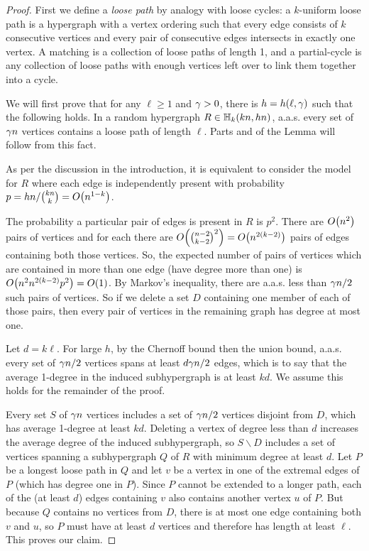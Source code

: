\documentclass[11pt,english]{article}
\theoremstyle{plain}
\theoremstyle{definition}
\theoremstyle{definition}
\theoremstyle{plain}
\theoremstyle{plain}
\theoremstyle{plain}
\theoremstyle{plain}
\theoremstyle{remark}
\theoremstyle{remark}
\let\originalleft\left
\let\originalright\right
\renewcommand{\left}{\mathopen{}\mathclose\bgroup\originalleft}
\renewcommand{\right}{\aftergroup\egroup\originalright}
\begin{document}
\begin{proof}
First we define a \emph{loose path} by analogy with loose cycles:
a $k$-uniform loose path is a hypergraph with a vertex ordering such
that every edge consists of $k$ consecutive vertices and every pair
of consecutive edges intersects in exactly one vertex. A matching
is a collection of loose paths of length 1, and a partial-cycle is any
collection of loose paths with enough vertices left over to link them
together into a cycle.

We will first prove that for any $\ell\ge1$ and $\gamma>0$, there
is $h=h\left(\ell,\patheps\right)$ such that the following holds. In a
random hypergraph $R\in\HH_{k}\left(kn,hn\right)$,
a.a.s. every set of $\gamma n$ vertices contains a loose path of length
$\ell$. Parts  and  of the Lemma will follow from this fact.

As per the discussion in the introduction, it is equivalent to consider
the model for $R$ where each edge is independently present with probability
$p=hn/{kn \choose k}=O\left(n^{1-k}\right)$.

The probability a particular pair of edges is present in $R$ is $p^2$. There are $O\left(n^2\right)$ pairs of vertices and for each there are $O\left({n-2\choose k-2}^2\right)=
O\left(n^{2\left(k-2\right)}\right)$ pairs of edges containing both those vertices. So, the expected number of pairs of vertices
which are contained in more than one edge (have degree more than one)
is $O\left(n^2n^{2\left(k-2\right)}p^2\right)=O\left(1\right)$. By Markov's inequality, there are a.a.s. less
than $\gamma n/2$ such pairs of vertices. So if we delete a
set $D$ containing one member of each of those pairs, then every pair of vertices in the remaining graph has
degree at most one.

Let $d=k\ell$. For
large $h$, by the Chernoff bound then the union
bound, a.a.s. every set of $\gamma n/2$ vertices spans at least $d\gamma n/2$
edges, which is to say that the average 1-degree in the induced subhypergraph
is at least $kd$. We assume this holds for the remainder of the proof.

Every set $S$ of $\gamma n$ vertices includes a set of $\gamma n/2$
vertices disjoint from $D$, which has average 1-degree at least $kd$.
Deleting a vertex of degree less than $d$ increases the average degree
of the induced subhypergraph, so $S\backslash D$ includes a set of
vertices spanning a subhypergraph $Q$ of $R$ with minimum degree
at least $d$. Let $P$ be a longest loose path in $Q$ and let $v$
be a vertex in one of the extremal edges of $P$ (which has degree one in $P$). Since $P$ cannot
be extended to a longer path, each of the (at least $d$) edges containing
$v$ also contains another vertex $u$ of $P$. But because $Q$ contains
no vertices from $D$, there is at most
one edge containing both $v$ and $u$, so $P$ must have at least
$d$ vertices and therefore has length at least $\ell$. This proves
our claim.


\end{proof}
\end{document}
